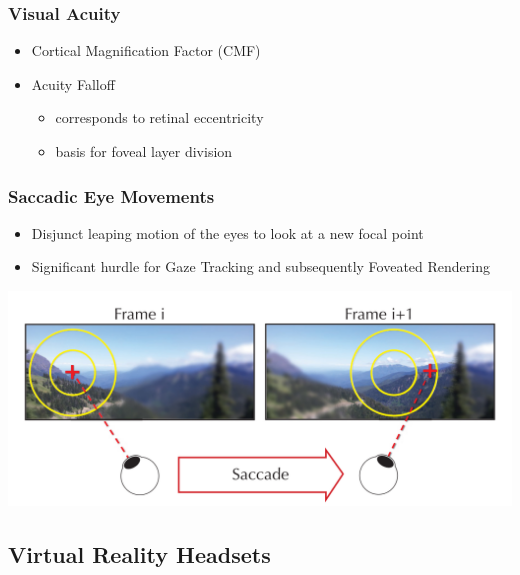 \documentclass{beamer}
\newcommand{\linespace}{\vskip 0.25cm}
\begin{document}
\begin{frame}
  \frametitle{Visual Acuity}
	\begin{itemize}
		\item Cortical Magnification Factor (CMF)
	\linespace
		\item Acuity Falloff
			\begin{itemize}
				\item corresponds to retinal eccentricity
				\item basis for foveal layer division
			\end{itemize}
	\end{itemize}
\end{frame}

\begin{frame}
  \frametitle{Saccadic Eye Movements}
	\begin{itemize}
		\item Disjunct leaping motion of the eyes to look at a new focal point
		\item Significant hurdle for Gaze Tracking and subsequently Foveated Rendering
	\end{itemize}
	
	  \begin{center}
    \includegraphics[width=.95\textwidth]{Illustrations/saccade.png}
    \\
  \end{center}
  
\end{frame}


\subsection{Virtual Reality Headsets}
\end{document}
